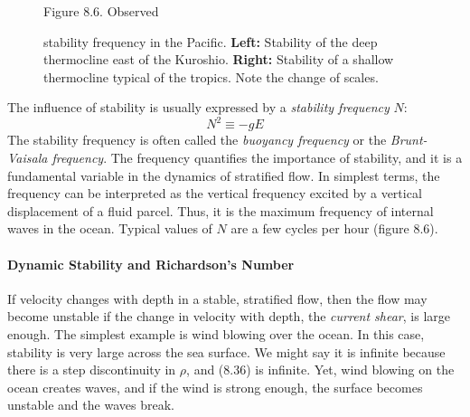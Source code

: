 \begin{figure}[t!]
\footnotesize
Figure 8.6. Observed \rule{0pt}{3ex} stability
frequency in the Pacific.
\textbf{Left:} Stability of the deep
thermocline east of the
Kuroshio.  \textbf{Right:} Stability of a
shallow thermocline typical of the tropics. Note the change of scales.
\label{fig:stabilityfreq}
\vspace{-3ex}
\end{figure}

The influence of stability is usually expressed by a \textit{stability
  frequency} $N$:
\begin{equation}
N^2 \equiv -g E
\end{equation}
The stability frequency is often called the
\textit{buoyancy frequency} or the
\textit{Brunt-Vaisala frequency}. The frequency quantifies the importance of
stability, and it is a fundamental variable in the dynamics of
stratified flow. In simplest terms, the frequency can be interpreted
as the vertical frequency excited by a vertical displacement of a
fluid parcel. Thus, it is the maximum frequency of internal waves in
the ocean. Typical values of $N$ are a few cycles per hour (figure
8.6).

\paragraph{Dynamic Stability and Richardson's Number}
If velocity changes with depth in a stable, stratified flow, then the
flow may become unstable if the change in velocity with depth, the
\textit{current shear}, is large
enough. The simplest example is wind blowing over the ocean. In this
case, stability is very large across the sea surface. We might say it
is infinite because there is a step discontinuity in $\rho$, and
(8.36) is infinite. Yet, wind blowing on the ocean creates waves, and
if the wind is strong enough, the surface becomes unstable and the
waves break.

